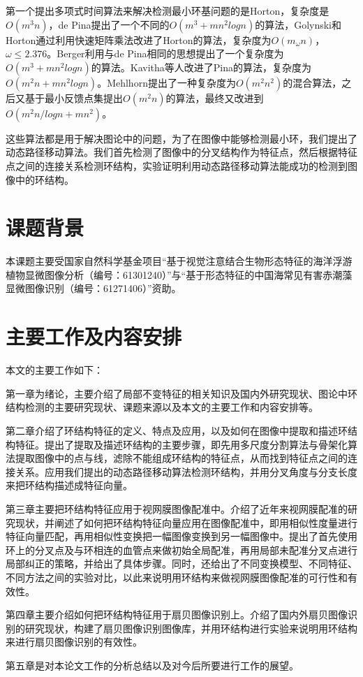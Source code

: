 第一个提出多项式时间算法来解决检测最小环基问题的是Horton\cite{horton}，复杂度是$O(m^3n)$，de Pina\cite{pina}提出了一个不同的$O(m^3+mn^2logn)$的算法，Golynski和Horton\cite{golynski}通过利用快速矩阵乘法改进了Horton的算法，复杂度为$O(m_{\omega}n)$，$\omega \le 2.376$。Berger\cite{berger}利用与de Pina相同的思想提出了一个复杂度为$O(m^3+mn^2logn)$的算法。Kavitha\cite{kavitha}等人改进了Pina的算法，复杂度为$O(m^2n+mn^2logn)$。Mehlhorn\cite{mehlhorn}提出了一种复杂度为$O(m^2n^2)$的混合算法，之后又基于最小反馈点集提出$O(m^2n)$的算法，最终又改进到$O(m^2n/logn + mn^2)$。

这些算法都是用于解决图论中的问题，为了在图像中能够检测最小环，我们提出了动态路径移动算法。我们首先检测了图像中的分叉结构作为特征点，然后根据特征点之间的连接关系检测环结构，实验证明利用动态路径移动算法能成功的检测到图像中的环结构。

\section{课题背景}
\label{sec:theorem}

本课题主要受国家自然科学基金项目“基于视觉注意结合生物形态特征的海洋浮游植物显微图像分析（编号：61301240）”与“基于形态特征的中国海常见有害赤潮藻显微图像识别（编号：61271406）”资助。


\section{主要工作及内容安排}
\label{sec:bib}

本文的主要工作如下：

第一章为绪论，主要介绍了局部不变特征的相关知识及国内外研究现状、图论中环结构检测的主要研究现状、课题来源以及本文的主要工作和内容安排等。

第二章介绍了环结构特征的定义、特点及应用，以及如何在图像中提取和描述环结构特征。提出了提取及描述环结构的主要步骤，即先用多尺度分割算法与骨架化算法提取图像中的点与线，滤除不能组成环结构的特征点，从而找到特征点之间的连接关系。应用我们提出的动态路径移动算法检测环结构，并用分叉角度与分支长度来把环结构描述成特征向量。

第三章主要把环结构特征应用于视网膜图像配准中。介绍了近年来视网膜配准的研究现状，并阐述了如何把环结构特征向量应用在图像配准中，即用相似性度量进行特征向量匹配，再用相似性变换把一幅图像变换到另一幅图像中。提出了首先使用环上的分叉点及与环相连的血管点来做初始全局配准，再用局部未配准分叉点进行局部纠正的策略，并给出了具体步骤。同时，还给出了不同变换模型、不同特征、不同方法之间的实验对比，以此来说明用环结构来做视网膜图像配准的可行性和有效性。

第四章主要介绍如何把环结构特征用于扇贝图像识别上。介绍了国内外扇贝图像识别的研究现状，构建了扇贝图像识别图像库，并用环结构进行实验来说明用环结构来进行扇贝图像识别的有效性。

第五章是对本论文工作的分析总结以及对今后所要进行工作的展望。
